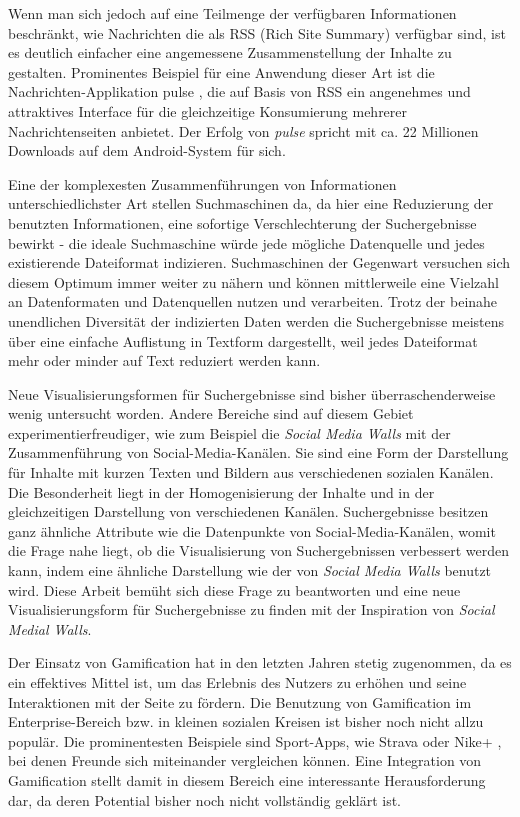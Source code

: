\documentclass[12pt,twoside]{book}
\begin{document}
Wenn man sich jedoch auf eine Teilmenge der verfügbaren Informationen beschränkt, wie Nachrichten die als RSS (Rich Site Summary) verfügbar sind, ist es deutlich einfacher eine angemessene Zusammenstellung der Inhalte zu gestalten. Prominentes Beispiel für eine Anwendung dieser Art ist die Nachrichten-Applikation pulse \cite{pulse}, die auf Basis von RSS ein angenehmes und attraktives Interface für die gleichzeitige Konsumierung mehrerer Nachrichtenseiten anbietet. Der Erfolg von \textit{pulse} spricht mit ca. 22 Millionen Downloads auf dem Android-System für sich.

Eine der komplexesten Zusammenführungen von Informationen unterschiedlichster Art stellen Suchmaschinen da, da hier eine Reduzierung der benutzten Informationen, eine sofortige Verschlechterung der Suchergebnisse bewirkt - die ideale Suchmaschine würde jede mögliche Datenquelle und jedes existierende Dateiformat indizieren.
Suchmaschinen der Gegenwart versuchen sich diesem Optimum immer weiter zu nähern und können mittlerweile eine Vielzahl an Datenformaten und Datenquellen nutzen und verarbeiten.
Trotz der beinahe unendlichen Diversität der indizierten Daten werden die Suchergebnisse meistens über eine einfache Auflistung in Textform dargestellt, weil jedes Dateiformat mehr oder minder auf Text reduziert werden kann.

Neue Visualisierungsformen für Suchergebnisse sind bisher überraschenderweise wenig untersucht worden. Andere Bereiche sind auf diesem Gebiet experimentierfreudiger, wie zum Beispiel die \textit{Social Media Walls} mit der Zusammenführung von Social-Media-Kanälen.
Sie sind eine Form der Darstellung für Inhalte mit kurzen Texten und Bildern aus verschiedenen sozialen Kanälen. Die Besonderheit liegt in der Homogenisierung der Inhalte und in der gleichzeitigen Darstellung von verschiedenen Kanälen.
Suchergebnisse besitzen ganz ähnliche Attribute wie die Datenpunkte von Social-Media-Kanälen, womit die Frage nahe liegt, ob die Visualisierung von Suchergebnissen verbessert werden kann, indem eine ähnliche Darstellung wie der von \textit{Social Media Walls} benutzt wird.
Diese Arbeit bemüht sich diese Frage zu beantworten und eine neue Visualisierungsform für Suchergebnisse zu finden mit der Inspiration von \textit{Social Medial Walls}.

Der Einsatz von Gamification hat in den letzten Jahren stetig zugenommen, da es ein effektives Mittel ist, um das Erlebnis des Nutzers zu erhöhen und seine Interaktionen mit der Seite zu fördern.
Die Benutzung von Gamification im Enterprise-Bereich bzw. in kleinen sozialen Kreisen ist bisher noch nicht allzu populär. Die prominentesten Beispiele sind Sport-Apps, wie Strava \cite{strava} oder Nike+ \cite{nike}, bei denen Freunde sich miteinander vergleichen können. Eine Integration von Gamification stellt damit in diesem Bereich eine interessante Herausforderung dar, da deren Potential bisher noch nicht vollständig geklärt ist.
\end{document}
